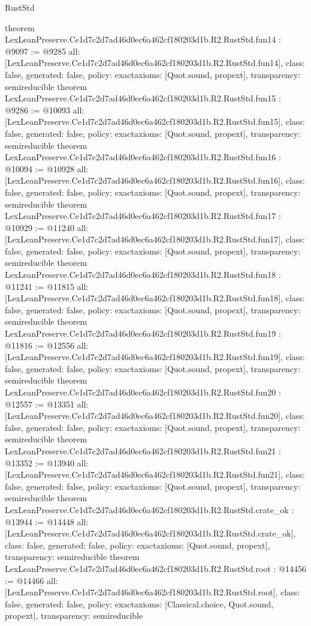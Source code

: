 \begin{lexlean}{RustStd}
\begin{coremodule}
{}
theorem LexLeanPreserve.Ce1d7c2d7ad46d0ec6a462cf180203d1b.R2.RustStd.fun14 : @9097 := @9285 {
  all: [LexLeanPreserve.Ce1d7c2d7ad46d0ec6a462cf180203d1b.R2.RustStd.fun14],
  class: false,
  generated: false,
  policy: exact{axioms: [Quot.sound, propext]},
  transparency: semireducible
}
theorem LexLeanPreserve.Ce1d7c2d7ad46d0ec6a462cf180203d1b.R2.RustStd.fun15 : @9286 := @10093 {
  all: [LexLeanPreserve.Ce1d7c2d7ad46d0ec6a462cf180203d1b.R2.RustStd.fun15],
  class: false,
  generated: false,
  policy: exact{axioms: [Quot.sound, propext]},
  transparency: semireducible
}
theorem LexLeanPreserve.Ce1d7c2d7ad46d0ec6a462cf180203d1b.R2.RustStd.fun16 : @10094 := @10928 {
  all: [LexLeanPreserve.Ce1d7c2d7ad46d0ec6a462cf180203d1b.R2.RustStd.fun16],
  class: false,
  generated: false,
  policy: exact{axioms: [Quot.sound, propext]},
  transparency: semireducible
}
theorem LexLeanPreserve.Ce1d7c2d7ad46d0ec6a462cf180203d1b.R2.RustStd.fun17 : @10929 := @11240 {
  all: [LexLeanPreserve.Ce1d7c2d7ad46d0ec6a462cf180203d1b.R2.RustStd.fun17],
  class: false,
  generated: false,
  policy: exact{axioms: [Quot.sound, propext]},
  transparency: semireducible
}
theorem LexLeanPreserve.Ce1d7c2d7ad46d0ec6a462cf180203d1b.R2.RustStd.fun18 : @11241 := @11815 {
  all: [LexLeanPreserve.Ce1d7c2d7ad46d0ec6a462cf180203d1b.R2.RustStd.fun18],
  class: false,
  generated: false,
  policy: exact{axioms: [Quot.sound, propext]},
  transparency: semireducible
}
theorem LexLeanPreserve.Ce1d7c2d7ad46d0ec6a462cf180203d1b.R2.RustStd.fun19 : @11816 := @12556 {
  all: [LexLeanPreserve.Ce1d7c2d7ad46d0ec6a462cf180203d1b.R2.RustStd.fun19],
  class: false,
  generated: false,
  policy: exact{axioms: [Quot.sound, propext]},
  transparency: semireducible
}
theorem LexLeanPreserve.Ce1d7c2d7ad46d0ec6a462cf180203d1b.R2.RustStd.fun20 : @12557 := @13351 {
  all: [LexLeanPreserve.Ce1d7c2d7ad46d0ec6a462cf180203d1b.R2.RustStd.fun20],
  class: false,
  generated: false,
  policy: exact{axioms: [Quot.sound, propext]},
  transparency: semireducible
}
theorem LexLeanPreserve.Ce1d7c2d7ad46d0ec6a462cf180203d1b.R2.RustStd.fun21 : @13352 := @13940 {
  all: [LexLeanPreserve.Ce1d7c2d7ad46d0ec6a462cf180203d1b.R2.RustStd.fun21],
  class: false,
  generated: false,
  policy: exact{axioms: [Quot.sound, propext]},
  transparency: semireducible
}
theorem LexLeanPreserve.Ce1d7c2d7ad46d0ec6a462cf180203d1b.R2.RustStd.crate_ok : @13944 := @14448 {
  all: [LexLeanPreserve.Ce1d7c2d7ad46d0ec6a462cf180203d1b.R2.RustStd.crate_ok],
  class: false,
  generated: false,
  policy: exact{axioms: [Quot.sound, propext]},
  transparency: semireducible
}
theorem LexLeanPreserve.Ce1d7c2d7ad46d0ec6a462cf180203d1b.R2.RustStd.root : @14456 := @14466 {
  all: [LexLeanPreserve.Ce1d7c2d7ad46d0ec6a462cf180203d1b.R2.RustStd.root],
  class: false,
  generated: false,
  policy: exact{axioms: [Classical.choice, Quot.sound, propext]},
  transparency: semireducible
}


\end{coremodule}
\end{lexlean}
